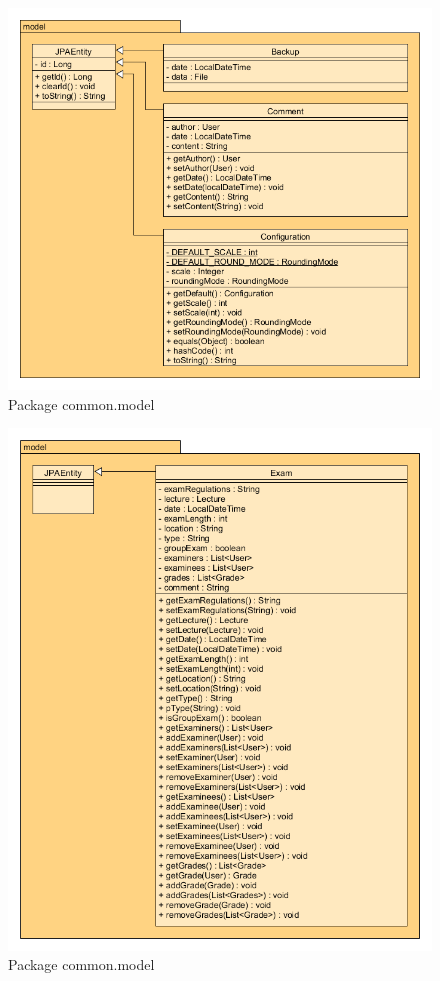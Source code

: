 \begin{figure}[H] \label{a}
	\centering
  \includegraphics[width=\textwidth]{../UMLDiagramme/common/model/gfx/4_package_model_part_1.png}
	\caption{Package common.model}
\end{figure}

\begin{figure}[H]
	\centering
  \includegraphics[width=\textwidth]{../UMLDiagramme/common/model/gfx/4_package_model_part_2.png}
	\caption{Package common.model}
\end{figure}

